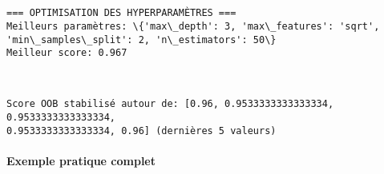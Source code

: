 \documentclass[11pt]{article}
\begin{document}
    \begin{center}
    \end{center}
    { \hspace*{\fill} \\}
    
    \begin{Verbatim}[commandchars=\\\{\}]

=== OPTIMISATION DES HYPERPARAMÈTRES ===
Meilleurs paramètres: \{'max\_depth': 3, 'max\_features': 'sqrt',
'min\_samples\_split': 2, 'n\_estimators': 50\}
Meilleur score: 0.967
    \end{Verbatim}

    \begin{center}
    \end{center}
    { \hspace*{\fill} \\}
    
    \begin{Verbatim}[commandchars=\\\{\}]
Score OOB stabilisé autour de: [0.96, 0.9533333333333334, 0.9533333333333334,
0.9533333333333334, 0.96] (dernières 5 valeurs)
    \end{Verbatim}

    \paragraph{Exemple pratique complet}\label{exemple-pratique-complet}
\end{document}
